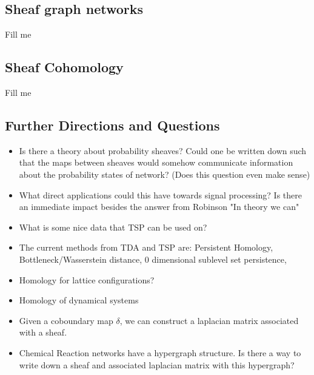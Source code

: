 \documentclass[12pt]{article}
\theoremstyle{plain}
\theoremstyle{definition}
\begin{document}
\subsection{Sheaf graph networks}

Fill me 

\subsection{Sheaf Cohomology}

Fill me

\subsection{Further Directions and Questions}

\begin{itemize}
  \item Is there a theory about probability sheaves? Could one be written down such that
    the maps between sheaves would somehow communicate information about the probability 
    states of network? (Does this question even make sense)

  \item What direct applications could this have towards signal processing? Is there an immediate
    impact besides the answer from Robinson "In theory we can"

  \item What is some nice data that TSP can be used on?

  \item The current methods from TDA and TSP are: Persistent Homology, Bottleneck/Wasserstein distance, 
    0 dimensional sublevel set persistence, 

  \item Homology for lattice configurations?

  \item Homology of dynamical systems

  \item Given a coboundary map $\delta$, we can construct a laplacian matrix associated with a sheaf.

  \item Chemical Reaction networks have a hypergraph structure. Is there a way to write down a sheaf and associated
    laplacian matrix with this hypergraph?

\end{itemize}
\end{document}
